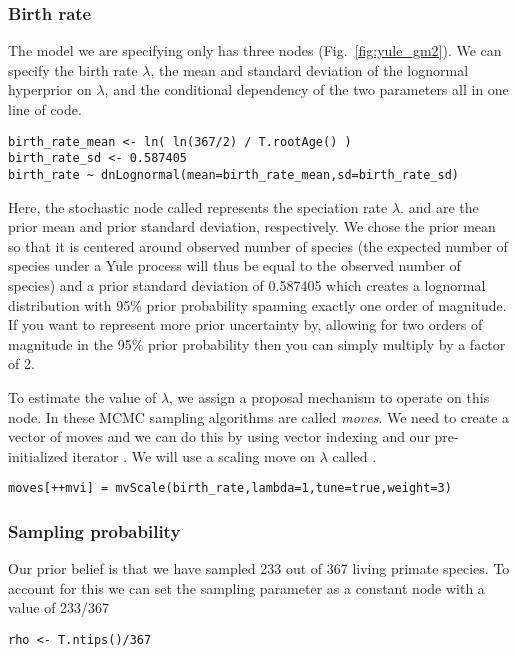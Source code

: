 \subsubsection{Birth rate}

The model we are specifying only has three nodes (Fig.~\ref{fig:yule_gm2}).
We can specify the birth rate $\lambda$, the mean and standard deviation of the lognormal hyperprior on $\lambda$, and the conditional dependency of the two parameters all in one line of \Rev code.
{\tt \begin{snugshade*}
\begin{lstlisting}
birth_rate_mean <- ln( ln(367/2) / T.rootAge() )
birth_rate_sd <- 0.587405
birth_rate ~ dnLognormal(mean=birth_rate_mean,sd=birth_rate_sd)
\end{lstlisting}
\end{snugshade*}}
Here, the stochastic node called  represents the speciation rate $\lambda$.
 and  are the prior mean and prior standard deviation, respectively.
We chose the prior mean so that it is centered around observed number of species (\IE the expected number of species under a Yule process will thus be equal to the observed number of species) and a prior standard deviation of 0.587405 which creates a lognormal distribution with 95\% prior probability spanning exactly one order of magnitude.
If you want to represent more prior uncertainty by, \EG allowing for two orders of magnitude in the 95\% prior probability then you can simply multiply  by a factor of 2.

To estimate the value of $\lambda$, we assign a proposal mechanism to operate on this node.
In \RevBayes these MCMC sampling algorithms are called \emph{moves}.
We need to create a vector of moves and we can do this by using vector indexing and our pre-initialized iterator .
We will use a scaling move on $\lambda$ called .
{\tt \begin{snugshade*}
\begin{lstlisting}
moves[++mvi] = mvScale(birth_rate,lambda=1,tune=true,weight=3)
\end{lstlisting}
\end{snugshade*}}

\subsubsection{Sampling probability}

Our prior belief is that we have sampled 233 out of 367 living primate species.
To account for this we can set the sampling parameter as a constant node with a value of 233/367
{\tt \begin{snugshade*}
\begin{lstlisting}
rho <- T.ntips()/367
\end{lstlisting}
\end{snugshade*}}


